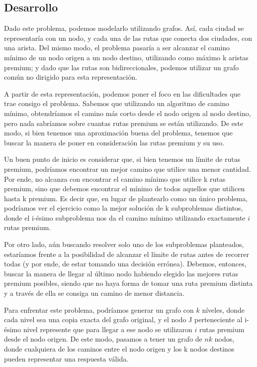 \subsection{Desarrollo}
Dado este problema, podemos modelarlo utilizando grafos. Así, cada ciudad se representaría con un nodo, y cada una de las rutas que conecta dos ciudades, con una arista. Del mismo modo, el problema pasaría a ser alcanzar el camino mínimo de un nodo origen a un nodo destino, utilizando como máximo k aristas premium; y dado que las rutas son bidireccionales, podemos utilizar un grafo común no dirigido para esta representación.
\\
\par
A partir de esta representación, podemos poner el foco en las dificultades que trae consigo el problema. Sabemos que utilizando un algoritmo de camino mínimo, obtendríamos el camino más corto desde el nodo origen al nodo destino, pero nada sabríamos sobre cuantas rutas premium se están utilizando. De este modo, si bien tenemos una aproximación buena del problema, tenemos que buscar la manera de poner en consideración las rutas premium y su uso. 
\\
\par
Un buen punto de inicio es considerar que, si bien tenemos un límite de rutas premium, podríamos encontrar un mejor camino que utilice una menor cantidad. Por ende, no alcanza con encontrar el camino mínimo que utilice k rutas premium, sino que debemos encontrar el mínimo de todos aquellos que utilicen hasta k premium. Es decir que, en lugar de plantearlo como un único problema, podríamos ver el ejercicio como la mejor solución de k subproblemas distintos, donde el i-ésimo subproblema nos da el camino mínimo utilizando exactamente $i$ rutas premium.
\\
\par
Por otro lado, aún buscando resolver solo uno de los subproblemas planteados, estaríamos frente a la posibilidad de alcanzar el límite de rutas antes de recorrer todas (y por ende, de estar tomando una decisión errónea). Debemos, entonces, buscar la manera de llegar al último nodo habiendo elegido las mejores rutas premium posibles, siendo que no haya forma de tomar una ruta premium distinta y a través de ella se consiga un camino de menor distancia.
\\
\par
Para enfrentar este problema, podríamos generar un grafo con $k$ níveles, donde cada nivel sea una copia exacta del grafo original, y el nodo J perteneciente al i-ésimo nivel represente que para llegar a ese nodo se utilizaron $i$ rutas premium desde el nodo origen. De este modo, pasamos a tener un grafo de $nk$ nodos, donde cualquiera de los caminos entre el nodo origen y los k nodos destinos pueden representar una respuesta válida.
